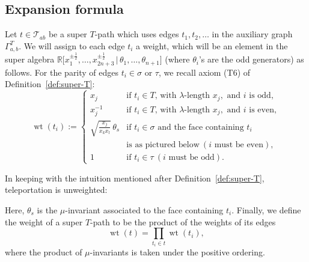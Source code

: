 \documentclass[pdftex]{sigma}
\numberwithin{equation}{section}
\DeclareMathOperator{\wt}{wt}
\begin{document}
\subsection{Expansion formula}

\begin{Definition}[weight] \label{def:weight}\rm
 Let $t \in \mathcal{T}_{ab}$ be a super $T$-path which uses edges $t_1,t_2,\dots$ in the auxiliary graph $\Gamma^T_{a,b}$.
 We will assign to each edge $t_i$ a weight, which will be an element in the super algebra
 $\mathbb R\bigl[x_1^{\pm\frac{1}{2}},\dots,x_{2n+3}^{\pm\frac{1}{2}} \,|\, \theta_1,\dots,\theta_{n+1}\bigr]$ (where $\theta_i$'s are the odd generators) as follows.
 For the parity of edges $t_i \in \sigma$ or $\tau$, we recall axiom (T6) of Definition~\ref{def:super-T}:
 \[
 \wt(t_i) := \begin{cases}
 x_j &\text{if } t_i \in T \text{, with }\lambda\text{-length }x_j, \text{ and }i \text{ is odd}, \\
 x_j^{-1} &\text{if } t_i \in T \text{, with }\lambda\text{-length }x_j, \text{ and }i \text{ is even}, \\
 \sqrt{\frac{x_j}{x_kx_l}} \, \theta_s &\text{if } t_i \in\sigma \text{ and the face containing }t_i \\
 & \text{is as pictured below} ~ (i \text{ must be even}), \\
 1&\text{if }t_i\in\tau~ (i \text{ must be odd}).
 \end{cases} \]

 In keeping with the intuition mentioned after Definition~\ref{def:super-T}, teleportation is unweighted:
 \begin{center}
 \end{center}
 Here, $\theta_s$ is the $\mu$-invariant associated to the face containing $t_i$.
	Finally, we define the weight of a super $T$-path to be the product of the weights of its edges
 \[\wt(t)=\prod_{t_i\in t}\wt(t_i),\]
 where the product of $\mu$-invariants is taken under the positive ordering.
\end{Definition}
\end{document}
